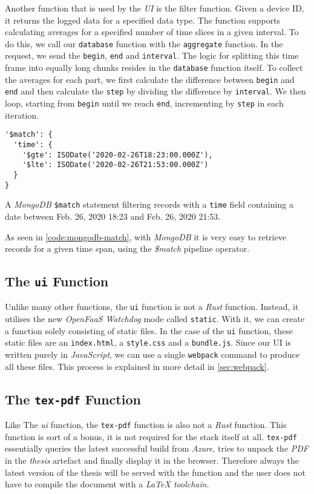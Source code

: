 Another function that is used by the \textit{UI} is the filter function. Given a device ID, it
returns the logged data for a specified data type. The function supports calculating averages for a
specified number of time slices in a given interval. To do this, we call our \texttt{database}
function with the \texttt{aggregate} function. In the request, we send the \texttt{begin},
\texttt{end} and \texttt{interval}. The logic for splitting this time frame into equally long chunks
resides in the \texttt{database} function itself. To collect the averages for each part, we first
calculate the difference between \texttt{begin} and \texttt{end} and then calculate the
\texttt{step} by dividing the difference by \texttt{interval}. We then loop, starting from
\texttt{begin} until we reach \texttt{end}, incrementing by \texttt{step} in each iteration.

\begin{code}[H]
  \begin{lstlisting}
'$match': {
  'time': {
    '$gte': ISODate('2020-02-26T18:23:00.000Z'),
    '$lte': ISODate('2020-02-26T21:53:00.000Z')
  }
}
  \end{lstlisting}
  \caption{A \textit{MongoDB} \texttt{\$match} statement filtering records with a \texttt{time}
  field containing a date between Feb. 26, 2020 18:23 and Feb. 26, 2020 21:53.}
  \label{code:mongodb-match}
\end{code}

As seen in \autoref{code:mongodb-match}, with \textit{MongoDB} it is very easy to retrieve records for a
given time span, using the \textit{\$match} pipeline operator.

\subsection{The \texttt{ui} Function}

Unlike many other functions, the \texttt{ui} function is not a \textit{Rust} function. Instead, it
utilises the new \textit{OpenFaaS Watchdog} mode called \texttt{static}. With it, we can create a
function solely consisting of static files. In the case of the \texttt{ui} function, these static
files are an \texttt{index.html}, a \texttt{style.css} and a \texttt{bundle.js}. Since our UI is
written purely in \textit{JavaScript}, we can use a single \texttt{webpack} command to produce all
these files. This process is explained in more detail in \autoref{sec:webpack}.

\subsection{The \texttt{tex-pdf} Function}

Like The \textit{ui} function, the \texttt{tex-pdf} function is also not a \textit{Rust} function.
This function is sort of a bonus, it is not required for the stack itself at all. \texttt{tex-pdf}
essentially queries the latest successful build from \textit{Azure}, tries to unpack the
\textit{PDF} in the \textit{thesis} artefact and finally display it in the browser. Therefore always
the latest version of the thesis will be served with the function and the user does not have to
compile the document with a \textit{LaTeX toolchain}.
